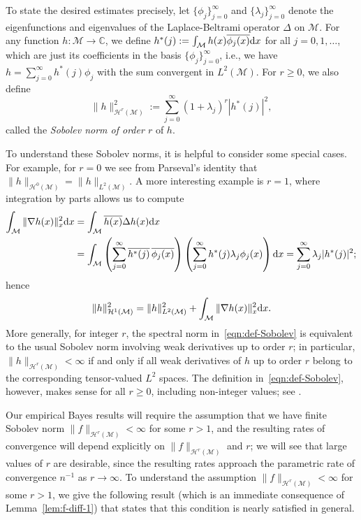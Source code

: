 \documentclass[preprint]{imsart}
\theoremstyle{plain}
\theoremstyle{definition}
\newcommand{\Cbb}{\mathbb{C}}
\newcommand{\Mcal}{\mathcal{M}}
\newcommand{\Hcal}{\mathcal{H}}
\newcommand{\diff}{\textnormal{d}}
\begin{document}
To state the desired estimates precisely, let $\{\phi_{j}\}_{j=0}^{\infty}$ and $\{\lambda_{j}\}_{j=0}^{\infty}$ denote the eigenfunctions and eigenvalues of the Laplace-Beltrami operator $\Delta$ on $\Mcal$.
For any function $h:\Mcal\to\Cbb$, we define $h^{\ast}(j):=\int_{\Mcal}h(x)\overline{\phi_j(x)}\diff x$ for all $j=0,1,\ldots$, which are just its coefficients in the basis $\{\phi_j\}_{j=0}^{\infty}$, i.e., we have $h = \sum_{j=0}^{\infty}h^{\ast}(j)\phi_j$ with the sum convergent in $L^2(\Mcal)$.
For $r\ge 0$, we also define
\begin{equation}\label{eqn:def-Sobolev}
    \|h\|_{\Hcal^r(\Mcal)}^2:= \sum_{j=0}^{\infty}(1 + \lambda_{j})^r|h^{\ast}(j)|^2,
\end{equation}
called the \textit{Sobolev norm of order $r$} of $h$.

To understand these Sobolev norms, it is helpful to consider some special cases.
For example, for $r=0$ we see from Parseval's identity that $\|h\|_{\Hcal^0(\Mcal)} = \|h\|_{L^2(\Mcal)}$.
A more interesting example is $r=1$, where integration by parts allows us to compute
\begin{align*}
    \int_{\Mcal}\|\nabla h(x)\|_x^2\diff x &= \int_{\Mcal}\overline{h(x)}\Delta h(x)\diff x \\
    &= \int_{\Mcal} \left(\sum_{j=0}^{\infty}\overline{h^{\ast}(j)}\,\overline{\phi_j(x)}\right)\left(\sum_{j=0}^{\infty}h^{\ast}(j)\lambda_j\phi_j(x)\right)\diff x = \sum_{j=0}^{\infty}\lambda_j |h^{\ast}(j)|^2;
\end{align*}
hence 
\begin{equation}\label{eqn:Sobolev-1-equiv}
    \|h\|^2_{\Hcal^1(\Mcal)} = \|h\|_{L^2(\Mcal)}^2+\int_{\Mcal}\|\nabla h(x)\|^2_x\diff x.
\end{equation}
More generally, for integer $r$, the spectral norm in~\eqref{eqn:def-Sobolev}
is equivalent to the usual Sobolev norm involving weak derivatives up to order
$r$; in particular, $\|h\|_{\Hcal^r(\Mcal)}<\infty$
if and only if all weak derivatives of $h$ up to order $r$ belong to the
corresponding tensor-valued $L^2$ spaces.
The definition in~\eqref{eqn:def-Sobolev}, however, makes sense for all
$r\ge0$, including non-integer values; see \cite[Chapter~2]{Aubin}.

Our empirical Bayes results will require the assumption that we have finite Sobolev norm $\|f\|_{\Hcal^r(\Mcal)}<\infty$ for some $r> 1$, and the resulting rates of convergence will depend explicitly on $\|f\|_{\Hcal^r(\Mcal)}$ and $r$; we will see that large values of $r$ are desirable, since the resulting rates approach the parametric rate of convergence $n^{-1}$ as $r\to\infty$.
To understand the assumption $\|f\|_{\Hcal^r(\Mcal)}<\infty$ for some $r> 1$, we give the following result (which is an immediate consequence of Lemma~\ref{lem:f-diff-1}) that states that this condition is nearly satisfied in general.
\end{document}
